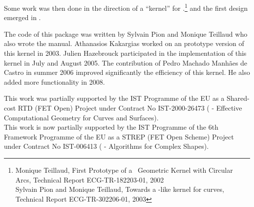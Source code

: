 Some work was then done in the direction of a ``kernel'' for
\cgal.\footnote{Monique Teillaud, First Prototype of a
\cgal\ Geometric Kernel with Circular Arcs, Technical Report
ECG-TR-182203-01, 2002\\Sylvain Pion and Monique Teillaud,
Towards a \cgal-like kernel for curves, Technical Report
ECG-TR-302206-01, 2003} and the first design emerged in
\cite{cgal:ekptt-tock-04}.

The code of this package was written by Sylvain Pion and Monique
Teillaud who also wrote the manual. Athanasios Kakargias worked on an
prototype version of this kernel in 2003. Julien Hazebrouck
participated in the implementation of this kernel in July and August
2005. The contribution of Pedro Machado Manh\~{a}es de Castro in
summer 2006 improved significantly the efficiency of this kernel. 
He also added more functionality in 2008. 

This work was partially supported by the IST Programme of the EU as a
Shared-cost RTD (FET Open) Project under Contract No IST-2000-26473
( - Effective
Computational Geometry for Curves and Surfaces).\\
This work is now partially supported by the IST Programme of the 6th
Framework Programme of the EU as a STREP (FET Open Scheme) Project
under Contract No IST-006413 ( -
Algorithms for Complex Shapes).
